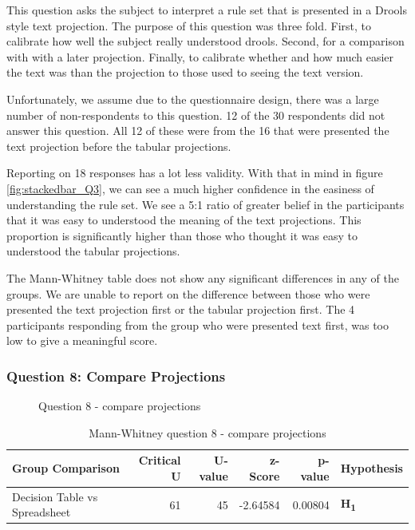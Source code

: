This question asks the subject to interpret a rule set that is presented in a Drools style text projection.
The purpose of this question was three fold.
First, to calibrate how well the subject really understood drools.
Second, for a comparison with with a later projection.
Finally, to calibrate whether and how much easier the text was than the projection to those used to seeing the text version.

Unfortunately, we assume due to the questionnaire design, there was a large number of non-respondents to this question. 
12 of the 30 respondents did not answer this question.
All 12 of these were from the 16 that were presented the text projection before the tabular projections.

Reporting on 18 responses has a lot less validity.
With that in mind in figure \ref{fig:stackedbar_Q3}, we can see a much higher confidence in the easiness of understanding the rule set.
We see a 5:1 ratio of greater belief in the participants that it was easy to understood the meaning of the text projections.
This proportion is significantly higher than those who thought it was easy to understood the tabular projections.

The Mann-Whitney table does not show any significant differences in any of the groups.
We are unable to report on the difference between those who were presented the text projection first or the tabular projection first.
The 4 participants responding from the group who were presented text first, was too low to give a meaningful score.

\pagebreak
\subsubsection{Question 8: Compare Projections}

\begin{figure}[H]
    \centering
    \caption{Question 8 - compare projections}
    \label{fig:stackedbar_Q4}
\end{figure}

\begin{table}[H]
    \begin{center}
        \begin{tabular}{ |l ||r |r |r | r|l | } 
            \hline
            Group Comparison                 & Critical U & U-value & z-Score  & p-value & Hypothesis         \\
            \hline
            \hline
            Decision Table vs Spreadsheet    & 61         & 45      &  -2.64584& 0.00804 & \textbf{H\textsubscript{1}} \\ 
            \hline
        \end{tabular}
    \end{center}
    \caption{Mann-Whitney question 8 - compare projections}
    \label{table:mannwhitneyQ4}
\end{table}

